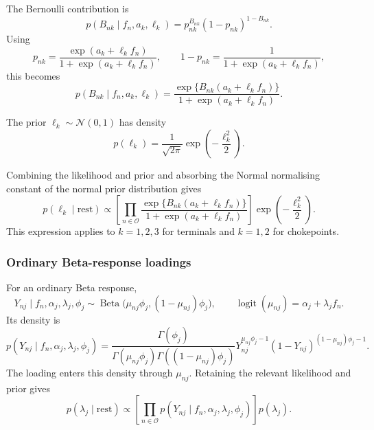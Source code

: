 \documentclass[pdftex,12pt,openright,a4paper,oneside]{book}
\begin{document}
The Bernoulli contribution is
\begin{equation*}
p(B_{nk}\mid f_n,a_k,\ell_k)
=
p_{nk}^{B_{nk}}(1-p_{nk})^{1-B_{nk}}.
\end{equation*}
Using
\begin{equation*}
p_{nk}
=
\frac{\exp(a_k+\ell_kf_n)}
{1+\exp(a_k+\ell_kf_n)},
\qquad
1-p_{nk}
=
\frac{1}{1+\exp(a_k+\ell_kf_n)},
\end{equation*}
this becomes
\begin{equation*}
p(B_{nk}\mid f_n,a_k,\ell_k)
=
\frac{
\exp\{B_{nk}(a_k+\ell_kf_n)\}
}{
1+\exp(a_k+\ell_kf_n)
}.
\end{equation*}

The prior $\ell_k\sim\mathcal{N}(0,1)$ has density
\begin{equation*}
p(\ell_k)
=
\frac{1}{\sqrt{2\pi}}
\exp\!\left(-\frac{\ell_k^2}{2}\right).
\end{equation*}

Combining the likelihood and prior and absorbing
the Normal normalising constant of the normal prior distribution gives
\begin{equation*}
p(\ell_k\mid\mathrm{rest})
\propto
\left[
\prod_{n\in\mathcal{O}}
\frac{
\exp\{B_{nk}(a_k+\ell_kf_n)\}
}{
1+\exp(a_k+\ell_kf_n)
}
\right]
\exp\!\left(-\frac{\ell_k^2}{2}\right).
\end{equation*}
This expression applies to $k=1,2,3$ for terminals
and $k=1,2$ for chokepoints.


\subsubsection{Ordinary Beta-response loadings}

For an ordinary Beta response,
\begin{equation*}
Y_{nj}\mid f_n,\alpha_j,\lambda_j,\phi_j
\sim
\operatorname{Beta}
\bigl(\mu_{nj}\phi_j,(1-\mu_{nj})\phi_j\bigr),
\qquad
\operatorname{logit}(\mu_{nj})
=
\alpha_j+\lambda_jf_n.
\end{equation*}
Its density is
\begin{equation*}
p(Y_{nj}\mid f_n,\alpha_j,\lambda_j,\phi_j)=
\frac{\Gamma(\phi_j)}
{\Gamma(\mu_{nj}\phi_j)
 \Gamma((1-\mu_{nj})\phi_j)}
Y_{nj}^{\mu_{nj}\phi_j-1}
(1-Y_{nj})^{(1-\mu_{nj})\phi_j-1}.
\end{equation*}
The loading enters this density through $\mu_{nj}$.
Retaining the relevant likelihood and prior gives
\begin{equation*}
p(\lambda_j\mid\mathrm{rest})
\propto
\left[
\prod_{n\in\mathcal{O}}
p(Y_{nj}\mid f_n,\alpha_j,\lambda_j,\phi_j)
\right]
p(\lambda_j).
\end{equation*}
\end{document}
